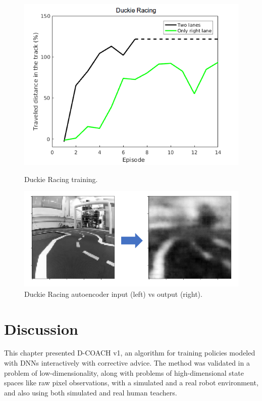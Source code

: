 \begin{figure}[H]
    \centering
    \begin{minipage}{.5\textwidth}
    \vspace{-0.2cm}
    \includegraphics[width=1.0\linewidth]{imagenes/cap3/racing_duckie_results.png}
    \vspace{-0.2cm}
    \caption{Duckie Racing training.}
    \label{fig:racing_duckie_results}
    \end{minipage}%
    \begin{minipage}{.5\textwidth}
    \centering
    \includegraphics[width=1.0\linewidth]{imagenes/cap3/AE_duckie2.png}
    \vspace{-0.2cm}
    \caption{Duckie Racing autoencoder input (left) vs output (right).}
    \label{fig:AE_duckie}
    \end{minipage}
\end{figure}

\section{Discussion}
This chapter presented D-COACH v1, an algorithm for training policies modeled with DNNs interactively with corrective advice. The method was validated in a problem of low-dimensionality, along with problems of high-dimensional state spaces like raw pixel observations, with a simulated and a real robot environment, and also using both simulated and real human teachers. 

